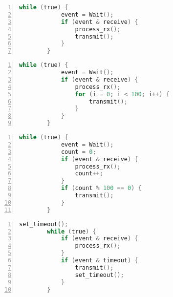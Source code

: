\noindent\begin{minipage}{.45\textwidth}
    \fontsmall
    \begin{lstlisting}[numbers=left, tabsize=2, language=C, caption={Echo client pseudo code},frame=tb, label={l:echo}]
        while (true) {
            event = Wait();
            if (event & receive) {
                process_rx();
                transmit();
            }
        }
    \end{lstlisting} 
    \end{minipage}\hfill
    \begin{minipage}{.45\textwidth}
    \fontsmall
    \begin{lstlisting}[numbers=left, tabsize=2, language=C, caption={Mostly transmit client pseudo code},frame=tb, label={l:tx}]
        while (true) {
            event = Wait();
            if (event & receive) {
                process_rx();
                for (i = 0; i < 100; i++) {
                    transmit();
                }
            }
        }
    \end{lstlisting}
\end{minipage}
\noindent\begin{minipage}{.45\textwidth}
    \fontsmall
    \begin{lstlisting}[numbers=left, tabsize=2, language=C, caption={Mostly receive client pseudo code},frame=tb, label={l:rx}]
        while (true) {
            event = Wait();
            count = 0;
            if (event & receive) {
                process_rx();
                count++;
            }
            if (count % 100 == 0) {
                transmit();
            }
        }
    \end{lstlisting} 
    \end{minipage}\hfill
    \begin{minipage}{.45\textwidth}
    \fontsmall
    \begin{lstlisting}[numbers=left, tabsize=2, language=C, caption={Client initiated transmit pseudo code},frame=tb, label={l:cl_tx}]
        set_timeout();
        while (true) {
            if (event & receive) {
                process_rx();
            }
            if (event & timeout) {
                transmit();
                set_timeout();
            }
        }
    \end{lstlisting}
\end{minipage}